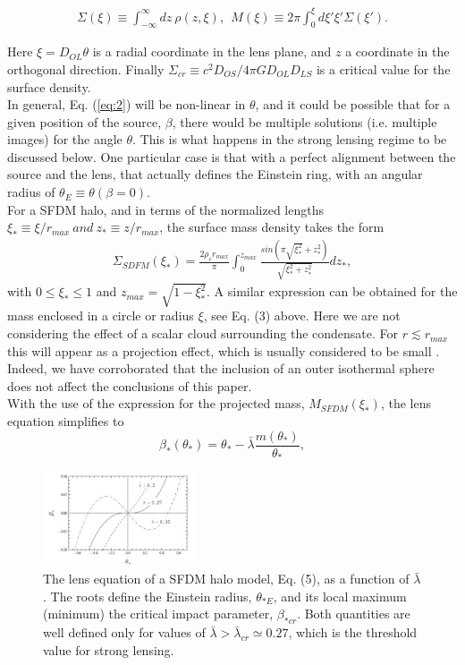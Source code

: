 \documentclass[10pt,letterpaper,twocolumn]{article}
\begin{document}
\begin{eqnarray}
\label{eq:3}
\Sigma(\xi)\equiv\int^{\infty}_{-\infty}dz~\rho(z,\xi),~~M(\xi)\equiv2\pi\int^{\xi}_{0}d\xi'\xi'\Sigma(\xi').
\end{eqnarray}

Here $\xi = D_{OL}\theta$ is a radial coordinate in the lens plane, and $z$ a coordinate in the orthogonal direction. Finally $\Sigma_{cr} \equiv c^{2}D_{OS}/4\pi{G}D_{OL}D_{LS}$ is a critical value for the surface density.\\
In general, Eq. (\ref{eq:2}) will be non-linear in $\theta$, and it could be possible that for a given position of the source, $\beta$, there
would be multiple solutions (i.e. multiple images) for
the angle $\theta$. This is what happens in the strong lensing regime to be discussed below. One particular case is that with a perfect alignment between the source and the lens, that actually defines the Einstein ring, with an angular radius of $\theta_{E}\equiv \theta (\beta = 0)$.\\
For a SFDM halo, and in terms of the normalized lengths $\xi_{*}\equiv\xi/r_{max}~and~z_{*}\equiv z/r_{max}$, the surface mass density takes the form
\begin{eqnarray}
\label{eq:4}
\Sigma_{SDFM}(\xi_{*})=\frac{2\rho_{c}r_{max}}{\pi}\int^{z_{max}}_{0}\frac{sin(\pi\sqrt{\xi^{2}_{*}}+z^{2}_{*})}{\sqrt{\xi^{2}_{*}+z^{2}_{*}}}dz_{*},
\end{eqnarray}
with $0\leq\xi_{*}\leq1$ and $z_{max}=\sqrt{1-\xi^{2}_{*}}$. A similar expression can be obtained for the mass enclosed in a circle or radius $\xi$, see Eq. (3) above. Here we are not considering the effect of a scalar cloud surrounding the
condensate. For $r\lesssim{r_{max}}$ this will appear as a projection effect, which is usually considered to be small \cite{13}. Indeed, we have corroborated that the inclusion of an outer isothermal sphere does not affect the conclusions of this paper.\\ 
With the use of the expression for the projected mass, $M_{SFDM}(\xi_{*})$, the lens equation simplifies to
\begin{equation}
\tag{5a}\label{eq:5a}
\beta_{*}(\theta_{*})=\theta_{*}-\bar{\lambda}\frac{m(\theta_{*})}{\theta_{*}},
\end{equation}

\begin{figure}[h]
    \centering
    \includegraphics[width=0.4\textwidth]{Figura 1.jpg}
    \caption{The lens equation of a SFDM halo model, Eq. (5), as
a function of $\bar{\lambda}$. The roots define the Einstein radius, $\theta_{*E}$, and its local maximum (minimum) the critical impact parameter, $\beta_{*cr}$. Both quantities are well defined only for values of $\bar{\lambda}>\bar{\lambda}_{cr}\simeq0.27$, which is the threshold value for strong lensing.}
    \label{Fig. 1}
\end{figure}
\end{document}
